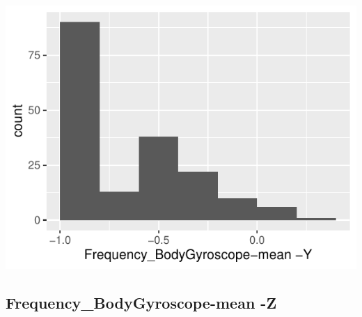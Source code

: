 \documentclass[
]{article}
\begin{document}
\begin{minipage}{0.25 \textwidth}

\includegraphics{codebook_tidydatasub_files/figure-latex/Var-62-Frequency-BodyGyroscope-mean--Y-1.pdf}

\end{minipage}

\noindent\makebox[\linewidth]{\rule{\textwidth}{0.4pt}}

\hypertarget{frequency_bodygyroscope-mean--z}{%
\subsection{Frequency\_BodyGyroscope-mean
-Z}\label{frequency_bodygyroscope-mean--z}}
\end{document}
